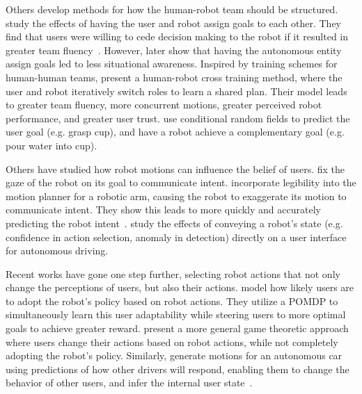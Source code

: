 Others develop methods for how the human-robot team should be structured. \citet{gombolay_2014} study the effects of having the user and robot assign goals to each other. They find that users were willing to cede decision making to the robot if it resulted in greater team fluency~\citep{gombolay_2014}. However, \citet{gombolay_2017} later show that having the autonomous entity assign goals led to less situational awareness. Inspired by training schemes for human-human teams, \citet{stefanos_2013} present a human-robot cross training method, where the user and robot iteratively switch roles to learn a shared plan. Their model leads to greater team fluency, more concurrent motions, greater perceived robot performance, and greater user trust. \citet{koppula_2013} use conditional random fields to predict the user goal (e.g. grasp cup), and have a robot achieve a complementary goal (e.g. pour water into cup).%






Others have studied how robot motions can influence the belief of users. \citet{sisbot_2010} fix the gaze of the robot on its goal to communicate intent. \citet{dragan_2013_legible} incorporate legibility into the motion planner for a robotic arm, causing the robot to exaggerate its motion to communicate intent. They show this leads to more quickly and accurately predicting the robot intent~\citep{dragan_2013_legible_hri}. \citet{rezvani_2016} study the effects of conveying a robot's state (e.g. confidence in action selection, anomaly in detection) directly on a user interface for autonomous driving. %

Recent works have gone one step further, selecting robot actions that not only change the perceptions of users, but also their actions. \citet{nikolaidis_2017_mutual} model how likely users are to adopt the robot's policy based on robot actions. They utilize a POMDP to simultaneously learn this user adaptability while steering users to more optimal goals to achieve greater reward. \citet{nikolaidis_2017_game} present a more general game theoretic approach where users change their actions based on robot actions, while not completely adopting the robot's policy. Similarly, \citet{sadigh_2016} generate motions for an autonomous car using predictions of how other drivers will respond, enabling them to change the behavior of other users, and infer the internal user state~\citep{sadigh_iros2016}.

